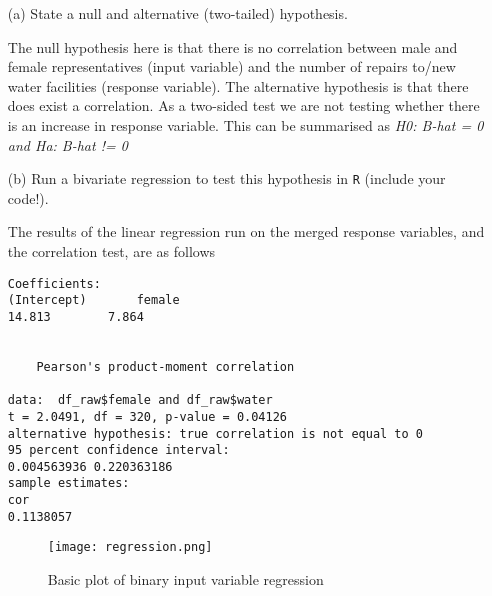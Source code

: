 \documentclass[12pt,letterpaper]{article}
\begin{document}
\newpage
\begin{enumerate}
	\item [(a)] State a null and alternative (two-tailed) hypothesis. 
	
	The null hypothesis here is that there is no correlation between male and female representatives (input variable) and the number of repairs to/new water facilities (response variable). The alternative hypothesis is that there does exist a correlation. As a two-sided test we are not testing whether there is an increase in response variable. This can be summarised as \textit{H0: B-hat = 0 and Ha: B-hat != 0}
	
	\vspace{2cm}
	\item [(b)] Run a bivariate regression to test this hypothesis in \texttt{R} (include your code!).
	
	 
	
	The results of the linear regression run on the merged response variables, and the correlation test, are as follows
	
\begin{verbatim}
Coefficients:
(Intercept)       female  
14.813        7.864  
	
	
	Pearson's product-moment correlation

data:  df_raw$female and df_raw$water
t = 2.0491, df = 320, p-value = 0.04126
alternative hypothesis: true correlation is not equal to 0
95 percent confidence interval:
0.004563936 0.220363186
sample estimates:
cor 
0.1138057
\end{verbatim}


	
\begin{figure}[h!]
		\caption{\footnotesize{Basic plot of binary input variable regression}}
		\label{regression.png}
		\texttt{[image: regression.png]}
\end{figure}			
	
\end{enumerate}	
\end{document}

